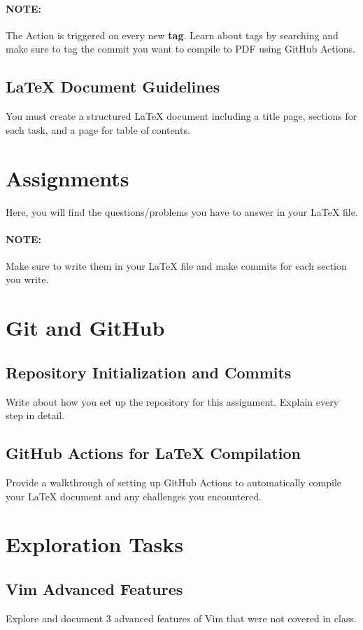 \documentclass[12pt]{article}
\begin{document}
	\paragraph{NOTE:} The Action is triggered on every new \textbf{tag}. Learn about tags by searching and make sure to tag the commit you want to compile to PDF using
	GitHub Actions.
	
	\subsection*{LaTeX Document Guidelines}
	You must create a structured LaTeX document including a title page, sections for each task, and a page for table of contents.
	
	
	\pagebreak
	
	
	\section*{Assignments}
	Here, you will find the questions/problems you have to answer in your LaTeX file.
	\paragraph{NOTE:} Make sure to write them in your LaTeX file and make commits for each section you write.
	
	\section{Git and GitHub}
	\subsection{Repository Initialization and Commits}
	Write about how you set up the repository for this assignment. Explain every step in detail.
	
	\subsection{GitHub Actions for LaTeX Compilation}
	Provide a walkthrough of setting up GitHub Actions to automatically compile your LaTeX document and any challenges you encountered.
	
	
	\section{Exploration Tasks}
	\subsection{Vim Advanced Features}
	Explore and document 3 advanced features of Vim that were not covered in class.
	
\end{document}
